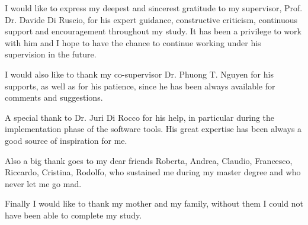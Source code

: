 \documentclass[
11pt, %
english, %
singlespacing, %
headsepline, %
]{MastersDoctoralThesis} %
\begin{document}


\vspace*{0.2\textheight}





\begin{acknowledgements}
\addchaptertocentry{\acknowledgementname} %

I would like to express my deepest and sincerest gratitude to my supervisor, Prof. Dr. Davide Di Ruscio, for his expert guidance, constructive criticism, continuous support and encouragement throughout my study. It has been a privilege to work with him and I hope to have the chance to continue working under his supervision in the future.

I would also like to thank my co-supervisor Dr. Phuong T. Nguyen for his supports, as well as for his patience, since he has been always available for comments and suggestions.

A special thank to Dr. Juri Di Rocco for his help, in particular during the implementation phase of the software tools. His great expertise has been always a good source of inspiration for me. %

Also a big thank goes to my dear friends Roberta, Andrea, Claudio, Francesco, Riccardo, Cristina, Rodolfo, who sustained me during my master degree and who never let me go mad.

Finally I would like to thank my mother and my family, without them I could not have been able to complete my study.

\end{acknowledgements}
\end{document}
